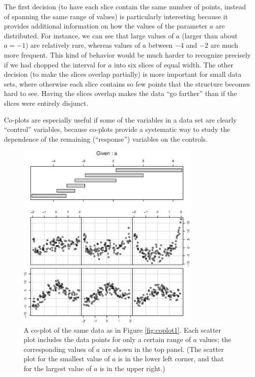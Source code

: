 The first decision (to have each slice contain the same number of
points, instead of spanning the same range of values) is particularly
interesting because it provides additional\vadjust{\pagebreak} information on how the
values of the parameter $a$ are distributed. For instance, we can see
that large values of $a$ (larger than about $a=-1$) are relatively
rare, whereas values of $a$ between $-4$ and $-2$ are much more
frequent. This kind of behavior would be much harder to recognize
precisely if we had chopped the interval for $a$ into six slices of
equal width. The other decision (to make the slices overlap partially)
is more important for small data sets, where otherwise each slice
contains so few points that the structure becomes hard to see.  Having
the slices overlap makes the data ``go farther'' than if the slices
were entirely disjunct.

Co-plots are especially useful if some of the variables in a data set
are clearly ``control'' variables, because co-plots provide a
systematic way to study the dependence of the remaining (``response'')
variables on the controls.


\begin{figure}
  \centerline{\includegraphics[width=0.8\textwidth]{img/coplot2.eps}}
  \caption{A co-plot of the same data as in Figure \ref{fig:coplot1}.
    Each scatter plot includes the data points for only a certain
    range of $a$ values; the corresponding values of $a$ are shown in
    the top panel.  (The scatter plot for the smallest value of $a$ is
    in the lower left corner, and that for the largest value of $a$ is
    in the upper right.)}
  \label{fig:coplot2}\vspace*{-6pt}
\end{figure}

